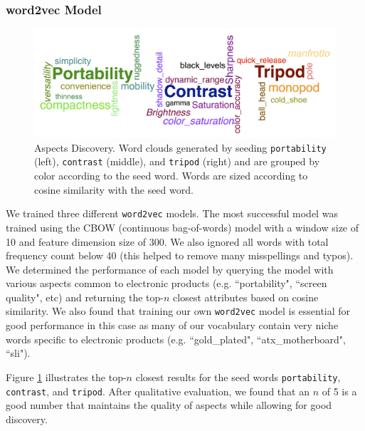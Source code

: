\documentclass{article} %
\begin{document}
\subsubsection{word2vec Model}
\begin{figure}[ht]
\begin{center}
\includegraphics[width=\columnwidth]{Aspects_long.png}
\end{center}
\caption{Aspects Discovery. Word clouds generated by seeding \texttt{portability} (left), \texttt{contrast} (middle), and \texttt{tripod} (right) and are grouped by color according to the seed word. Words are sized according to cosine similarity with the seed word.}
\label{aspectFig}
\end{figure}

We trained three different \texttt{word2vec} models. The most successful model was trained using the CBOW (continuous bag-of-words) model with a window size of 10 and feature dimension size of 300. We also ignored all words with total frequency count below 40 (this helped to remove many misspellings and typos). We determined the performance of each model by querying the model with various aspects common to electronic products (e.g. ``portability", ``screen quality", etc) and returning the top-$n$ closest attributes based on cosine similarity. We also found that training our own \texttt{word2vec} model is essential for good performance in this case as many of our vocabulary contain very niche words specific to electronic products (e.g. ``gold\_plated", ``atx\_motherboard", ``sli").

Figure \ref{aspectFig} illustrates the top-$n$ closest results for the seed words \texttt{portability}, \texttt{contrast}, and \texttt{tripod}. After qualitative evaluation, we found that an $n$ of 5 is a good number that maintains the quality of aspects while allowing for good discovery.
\end{document}
